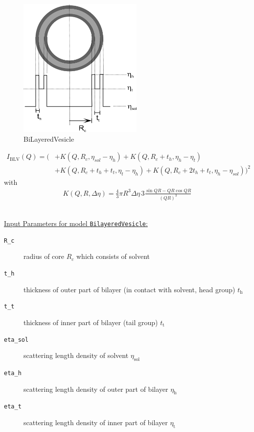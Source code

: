 \begin{figure}[htb]
\begin{center}
\includegraphics[width=0.5441\textwidth]{../images/form_factor/spheres/BiLayeredVesicle.png}
\end{center}
\caption{BiLayeredVesicle} \label{fig:BiLayeredVesicle}
\end{figure}
\begin{align}
I_\text{BLV}(Q) = \bigg( & + K(Q,R_c,\eta_{sol}-\eta_{h})+ K(Q,R_c+t_{h},\eta_{h}-\eta_{t}) \\
&+ K(Q,R_c+t_{h}+t_{t},\eta_{t}-\eta_{h}) +
K(Q,R_c+2t_{h}+t_{t},\eta_{h}-\eta_{sol}) \bigg)^2 \nonumber
\end{align}
with
\begin{align}
 K(Q,R,\Delta\eta) = \frac{4}{3}\pi R^3 \Delta\eta \, 3 \frac{\sin QR - QR \cos QR}{(QR)^3}
\end{align}

\vspace{5mm}
\hspace{1pt}\\
\uline{Input Parameters for model \texttt{BilayeredVesicle}:}\\
\begin{description}
\item[\texttt{R\_c}] radius of core $R_c$ which consists of solvent
\item[\texttt{t\_h}] thickness of outer part of bilayer (in contact with solvent, head group) $t_\text{h}$
\item[\texttt{t\_t}] thickness of inner part of bilayer (tail group) $t_\text{t}$
\item[\texttt{eta\_sol}] scattering length density of solvent $\eta_\text{sol}$
\item[\texttt{eta\_h}] scattering length density of outer part of bilayer $\eta_\text{h}$
\item[\texttt{eta\_t}] scattering length density of inner part of bilayer $\eta_\text{t}$
\end{description}

